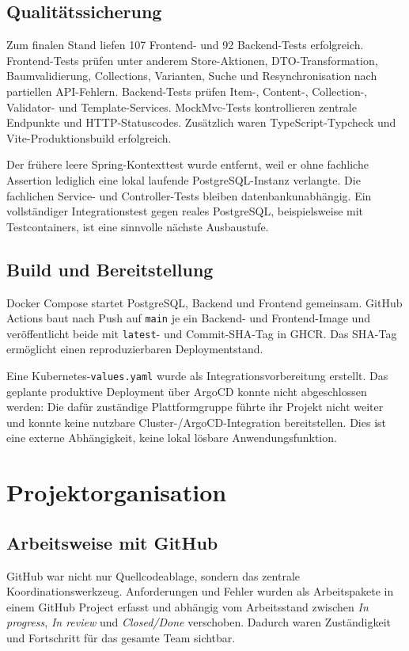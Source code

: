 \documentclass[11pt,a4paper]{article}
\begin{document}
\subsection{Qualitätssicherung}
Zum finalen Stand liefen 107 Frontend- und 92 Backend-Tests erfolgreich.
Frontend-Tests prüfen unter anderem Store-Aktionen, DTO-Transformation,
Baumvalidierung, Collections, Varianten, Suche und Resynchronisation nach
partiellen API-Fehlern. Backend-Tests prüfen Item-, Content-, Collection-,
Validator- und Template-Services. MockMvc-Tests kontrollieren zentrale
Endpunkte und HTTP-Statuscodes. Zusätzlich waren TypeScript-Typcheck und
Vite-Produktionsbuild erfolgreich.

Der frühere leere Spring-Kontexttest wurde entfernt, weil er ohne fachliche
Assertion lediglich eine lokal laufende PostgreSQL-Instanz verlangte. Die
fachlichen Service- und Controller-Tests bleiben datenbankunabhängig. Ein
vollständiger Integrationstest gegen reales PostgreSQL, beispielsweise mit
Testcontainers, ist eine sinnvolle nächste Ausbaustufe.

\subsection{Build und Bereitstellung}
Docker Compose startet PostgreSQL, Backend und Frontend gemeinsam. GitHub
Actions baut nach Push auf \texttt{main} je ein Backend- und Frontend-Image
und veröffentlicht beide mit \texttt{latest}- und Commit-SHA-Tag in GHCR. Das
SHA-Tag ermöglicht einen reproduzierbaren Deploymentstand.

Eine Kubernetes-\texttt{values.yaml} wurde als Integrationsvorbereitung
erstellt. Das geplante produktive Deployment über ArgoCD konnte nicht
abgeschlossen werden: Die dafür zuständige Plattformgruppe führte ihr Projekt
nicht weiter und konnte keine nutzbare Cluster-/ArgoCD-Integration
bereitstellen. Dies ist eine externe Abhängigkeit, keine lokal lösbare
Anwendungsfunktion.

\section{Projektorganisation}
\subsection{Arbeitsweise mit GitHub}
GitHub war nicht nur Quellcodeablage, sondern das zentrale
Koordinationswerkzeug. Anforderungen und Fehler wurden als Arbeitspakete in
einem GitHub Project erfasst und abhängig vom Arbeitsstand zwischen
\emph{In progress}, \emph{In review} und \emph{Closed/Done} verschoben.
Dadurch waren Zuständigkeit und Fortschritt für das gesamte Team sichtbar.
\end{document}
